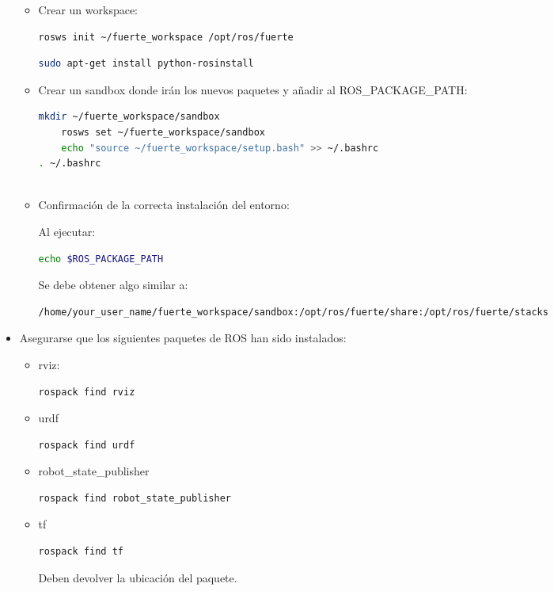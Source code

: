 \documentclass[12pt,a4paper,final,twoside]{book}
\begin{document}
\begin{itemize}
\begin{itemize}
\item Crear un workspace:
\begin{lstlisting}[language=bash]
	rosws init ~/fuerte_workspace /opt/ros/fuerte
\end{lstlisting}
\begin{lstlisting}[language=bash]
	sudo apt-get install python-rosinstall
\end{lstlisting}
\item Crear un sandbox donde irán los nuevos paquetes y añadir al ROS{\_}PACKAGE{\_}PATH:
\begin{lstlisting}[language=bash]
	mkdir ~/fuerte_workspace/sandbox
	rosws set ~/fuerte_workspace/sandbox
	echo "source ~/fuerte_workspace/setup.bash" >> ~/.bashrc
. ~/.bashrc
	
\end{lstlisting}
\item Confirmación de la correcta instalación del entorno:

Al ejecutar:
\begin{lstlisting}[language=bash]
	echo $ROS_PACKAGE_PATH
\end{lstlisting}
Se debe obtener algo similar a:
\begin{lstlisting}[language=bash]
	/home/your_user_name/fuerte_workspace/sandbox:/opt/ros/fuerte/share:/opt/ros/fuerte/stacks
\end{lstlisting}
\end{itemize}

\item Asegurarse que los siguientes paquetes de ROS han sido instalados:
\begin{itemize}
\item rviz:
\begin{lstlisting}[language=bash]
	rospack find rviz
\end{lstlisting}
\item urdf
\begin{lstlisting}[language=bash]
	rospack find urdf
\end{lstlisting}
\item robot{\_}state{\_}publisher
\begin{lstlisting}[language=bash]
	rospack find robot_state_publisher
\end{lstlisting}
\item tf
\begin{lstlisting}[language=bash]
	rospack find tf
\end{lstlisting}


Deben devolver la ubicación del paquete.
\end{itemize}


\end{itemize}
\end{document}
